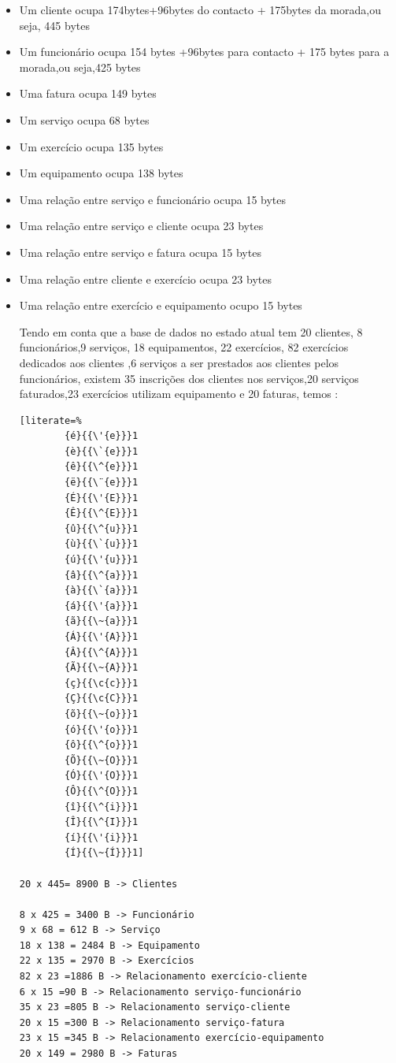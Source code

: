 \begin{itemize}
\item Um cliente ocupa 174bytes+96bytes do contacto +  175bytes da morada,ou seja, 445 bytes
\item Um funcionário ocupa 154 bytes +96bytes para contacto + 175 bytes para a morada,ou seja,425 bytes
\item Uma fatura ocupa 149 bytes
\item Um serviço ocupa 68 bytes
\item Um exercício ocupa 135 bytes
\item Um equipamento ocupa 138 bytes
\item Uma relação entre serviço e funcionário ocupa 15 bytes
\item Uma relação entre serviço e cliente ocupa  23 bytes
\item Uma relação entre serviço e fatura ocupa 15 bytes
\item Uma relação entre cliente e exercício ocupa 23 bytes
\item Uma relação entre exercício e equipamento ocupo 15 bytes

Tendo em conta que a base de dados no estado atual tem 20 clientes, 8 funcionários,9 serviços, 18 equipamentos, 22 exercícios, 82 exercícios dedicados aos clientes ,6 serviços a ser prestados aos clientes pelos funcionários, existem 35 inscrições dos clientes nos serviços,20 serviços faturados,23 exercícios utilizam equipamento e 20 faturas, temos :

\begin{lstlisting}[literate=%
        {é}{{\'{e}}}1
        {è}{{\`{e}}}1
        {ê}{{\^{e}}}1
        {ë}{{\¨{e}}}1
        {É}{{\'{E}}}1
        {Ê}{{\^{E}}}1
        {û}{{\^{u}}}1
        {ù}{{\`{u}}}1
        {ú}{{\'{u}}}1
        {â}{{\^{a}}}1
        {à}{{\`{a}}}1
        {á}{{\'{a}}}1
        {ã}{{\~{a}}}1
        {Á}{{\'{A}}}1
        {Â}{{\^{A}}}1
        {Ã}{{\~{A}}}1
        {ç}{{\c{c}}}1
        {Ç}{{\c{C}}}1
        {õ}{{\~{o}}}1
        {ó}{{\'{o}}}1
        {ô}{{\^{o}}}1
        {Õ}{{\~{O}}}1
        {Ó}{{\'{O}}}1
        {Ô}{{\^{O}}}1
        {î}{{\^{i}}}1
        {Î}{{\^{I}}}1
        {í}{{\'{i}}}1
        {Í}{{\~{Í}}}1]

20 x 445= 8900 B -> Clientes

8 x 425 = 3400 B -> Funcionário
9 x 68 = 612 B -> Serviço
18 x 138 = 2484 B -> Equipamento 
22 x 135 = 2970 B -> Exercícios
82 x 23 =1886 B -> Relacionamento exercício-cliente
6 x 15 =90 B -> Relacionamento serviço-funcionário
35 x 23 =805 B -> Relacionamento serviço-cliente
20 x 15 =300 B -> Relacionamento serviço-fatura
23 x 15 =345 B -> Relacionamento exercício-equipamento
20 x 149 = 2980 B -> Faturas


\end{lstlisting}
\end{itemize}
